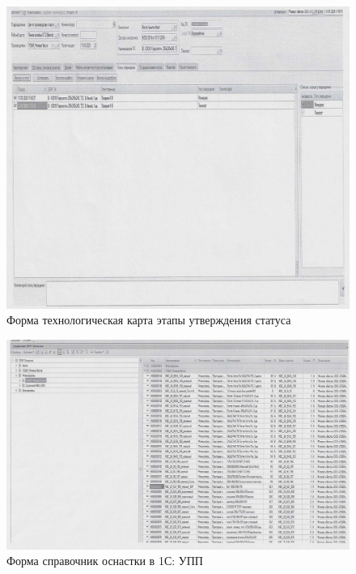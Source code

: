 \begin{figure}
\begin{center}
 \includegraphics[height=0.4\textheight, keepaspectratio]{Pics/II.4...jpg}
\end{center}
 \caption{Форма технологическая карта этапы утверждения статуса}
 \label{pic:II.4...}
\end{figure}

\begin{figure}
\begin{center}
 \includegraphics[height=0.4\textheight, keepaspectratio]{Pics/II.5.3...jpg}
\end{center}
 \caption{Форма справочник оснастки в 1С: УПП}
 \label{pic:II.5.3..}
\end{figure}


